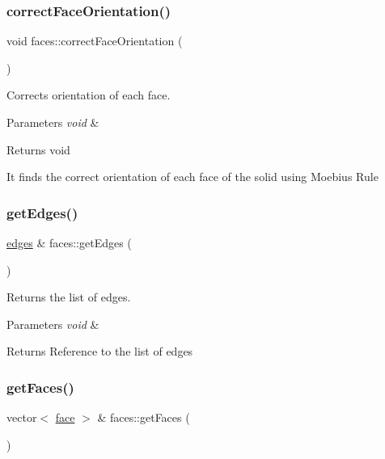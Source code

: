 \subsubsection{\texorpdfstring{correct\+Face\+Orientation()}{correctFaceOrientation()}}
{\footnotesize\ttfamily void faces\+::correct\+Face\+Orientation (\begin{DoxyParamCaption}{ }\end{DoxyParamCaption})}



Corrects orientation of each face. 


\begin{DoxyParams}{Parameters}
{\em void} & \\
\hline
\end{DoxyParams}
\begin{DoxyReturn}{Returns}
void
\end{DoxyReturn}
It finds the correct orientation of each face of the solid using Moebius Rule \mbox{\label{classfaces_a0c3f9f40aa96dc960a4eb42408b50574}} 
\subsubsection{\texorpdfstring{get\+Edges()}{getEdges()}}
{\footnotesize\ttfamily \mbox{\hyperlink{classedges}{edges}} \& faces\+::get\+Edges (\begin{DoxyParamCaption}{ }\end{DoxyParamCaption})}



Returns the list of edges. 


\begin{DoxyParams}{Parameters}
{\em void} & \\
\hline
\end{DoxyParams}
\begin{DoxyReturn}{Returns}
Reference to the list of edges 
\end{DoxyReturn}
\mbox{\label{classfaces_a4522c25dc2608217b6bebfe550ec79a5}} 
\subsubsection{\texorpdfstring{get\+Faces()}{getFaces()}}
{\footnotesize\ttfamily vector$<$ \mbox{\hyperlink{structface}{face}} $>$ \& faces\+::get\+Faces (\begin{DoxyParamCaption}{ }\end{DoxyParamCaption})}



